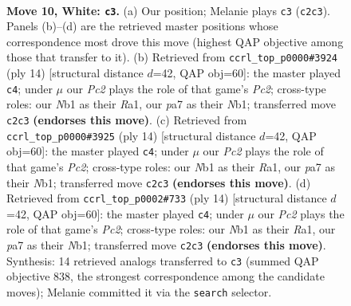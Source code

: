 \documentclass[11pt]{article}
\begin{document}
\clearpage

\begin{figure}[p]\centering
\begin{subfigure}{0.46\textwidth}\centering
\resizebox{\linewidth}{!}{%
\newchessgame
\chessboard[
  setfen={r1b1kbnr/p1ppqppp/8/4P3/2p3PP/8/PPP1QP2/RNB1KB1R w KQkq - 0 10},
  showmover=false,
  pgfstyle=straightmove, color=movearrow, markmove={c2-c3}
]}
\caption{}
\end{subfigure}\hfill
\begin{subfigure}{0.46\textwidth}\centering
\resizebox{\linewidth}{!}{%
\newchessgame
\chessboard[
  setfen={r1b1kb1r/p1ppqppp/2p5/3nP3/8/8/PPP1QPPP/RNB1KB1R w KQkq - 3 8},
  showmover=false,
  pgfstyle=straightmove, color=movearrow, markmove={c2-c4}
]}
\caption{}
\end{subfigure}
\\[4pt]
\begin{subfigure}{0.46\textwidth}\centering
\resizebox{\linewidth}{!}{%
\newchessgame
\chessboard[
  setfen={r1b1kb1r/p1ppqppp/2p5/3nP3/8/8/PPP1QPPP/RNB1KB1R w KQkq - 3 8},
  showmover=false,
  pgfstyle=straightmove, color=movearrow, markmove={c2-c4}
]}
\caption{}
\end{subfigure}\hfill
\begin{subfigure}{0.46\textwidth}\centering
\resizebox{\linewidth}{!}{%
\newchessgame
\chessboard[
  setfen={r1b1kb1r/p1ppqppp/2p5/3nP3/8/8/PPP1QPPP/RNB1KB1R w KQkq - 3 8},
  showmover=false,
  pgfstyle=straightmove, color=movearrow, markmove={c2-c4}
]}
\caption{}
\end{subfigure}
\caption{\textbf{Move 10, White: \texttt{c3}.} (a) Our position; Melanie plays \texttt{c3} (\texttt{c2c3}). Panels (b)--(d) are the retrieved master positions whose correspondence most drove this move (highest QAP objective among those that transfer to it). (b) Retrieved from \texttt{ccrl\_top\_p0000\#3924} (ply 14) [structural distance $d$=42, QAP obj=60]: the master played \texttt{c4}; under $\mu$ our \emph{Pc2} plays the role of that game's \emph{Pc2}; cross-type roles: our \emph{N}b1 as their \emph{R}a1, our \emph{p}a7 as their \emph{N}b1; transferred move \texttt{c2c3} \textbf{(endorses this move)}. (c) Retrieved from \texttt{ccrl\_top\_p0000\#3925} (ply 14) [structural distance $d$=42, QAP obj=60]: the master played \texttt{c4}; under $\mu$ our \emph{Pc2} plays the role of that game's \emph{Pc2}; cross-type roles: our \emph{N}b1 as their \emph{R}a1, our \emph{p}a7 as their \emph{N}b1; transferred move \texttt{c2c3} \textbf{(endorses this move)}. (d) Retrieved from \texttt{ccrl\_top\_p0002\#733} (ply 14) [structural distance $d$=42, QAP obj=60]: the master played \texttt{c4}; under $\mu$ our \emph{Pc2} plays the role of that game's \emph{Pc2}; cross-type roles: our \emph{N}b1 as their \emph{R}a1, our \emph{p}a7 as their \emph{N}b1; transferred move \texttt{c2c3} \textbf{(endorses this move)}. Synthesis: 14 retrieved analogs transferred to \texttt{c3} (summed QAP objective 838, the strongest correspondence among the candidate moves); Melanie committed it via the \texttt{search} selector.}
\label{fig:thought-m18}
\end{figure}
\end{document}
